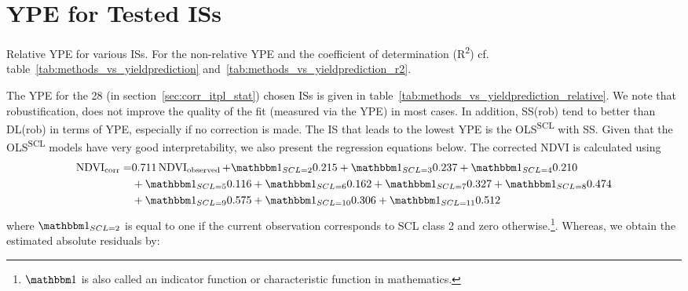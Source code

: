 \section{YPE for Tested ISs} \label{sec:results_ndvi_corr}
	\begin{table}
		\begin{center}
			\caption[Relative Yield Estimation Error for ISs]{Relative YPE for various ISs. For the non-relative YPE and the coefficient of determination (R\textsuperscript{2}) cf. table~\ref{tab:methods_vs_yieldprediction} and~\ref{tab:methods_vs_yieldprediction_r2}.}
			\small
			
			\label{tab:methods_vs_yieldprediction_relative}
			\normalsize
		\end{center}
	\end{table}
	The YPE for the 28 (in section~\ref{sec:corr_itpl_stat}) chosen {{IS}}s is given in table~\ref{tab:methods_vs_yieldprediction_relative}. We note that robustification, does not improve the quality of the fit (measured via the YPE) in most cases. 
	In addition, SS(rob) tend to better than DL(rob) in terms of YPE, especially if no correction is made. The {{IS}} that leads to the lowest YPE is the OLS\textsuperscript{SCL} with SS. Given that the OLS\textsuperscript{SCL} models have very good interpretability, we also present the regression equations below. The corrected NDVI is calculated using 
	\begin{equation}\label{eq:corr_lm}
		\begin{aligned}		
			{\operatorname{NDVI}}_{\text{corr}}  = &
			0.711 \operatorname{NDVI}_\text{observed}  
			+ \mathbbm 1_{{SCL = 2}} 0.215 
			+ \mathbbm 1_{{SCL = 3}} 0.237 
			+ \mathbbm 1_{{SCL = 4}} 0.210 \\ &
			+ \mathbbm 1_{{SCL = 5}} 0.116 
			+ \mathbbm 1_{{SCL = 6}} 0.162 
			+ \mathbbm 1_{{SCL = 7}} 0.327 
			+ \mathbbm 1_{{SCL = 8}} 0.474 \\ &
			+ \mathbbm 1_{{SCL = 9}} 0.575 
			+ \mathbbm 1_{{SCL = 10}} 0.306 
			+ \mathbbm 1_{{SCL = 11}} 0.512 
		\end{aligned}
	\end{equation} 
	where $\mathbbm 1_{{SCL = 2}}$ is equal to one if the current observation corresponds to SCL class 2 and zero otherwise.\footnote{$\mathbbm 1$ is also called an indicator function or characteristic function in mathematics.}. Whereas, we obtain the estimated absolute residuals by: 
